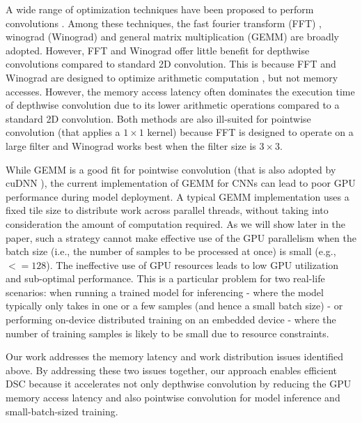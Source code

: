 A wide range of optimization techniques have been proposed to perform convolutions
\cite{Zhen2018Optimizing,liu2019optimizing,winter2019adaptive,li2019autofft,yan2020optimizing,Vasudevan2017Parallel,li2019coordinated,wu2020ugemm}.
Among these techniques, the fast fourier transform (FFT) \cite{li2019autofft}, winograd (Winograd) \cite{yan2020optimizing} and general
matrix multiplication (GEMM) \cite{Vasudevan2017Parallel,li2019coordinated,wu2020ugemm} are broadly adopted. However, FFT and Winograd offer little
benefit for depthwise convolutions compared to standard 2D convolution. This is because FFT and Winograd are designed to optimize
arithmetic computation \cite{zlateski2019anatomy,yan2020optimizing}, but not memory accesses. However, the memory access latency often dominates the execution time of
depthwise convolution \cite{cudaperformance} due to its lower arithmetic operations compared to a standard 2D convolution.  Both methods
are also ill-suited for pointwise convolution (that applies a $1 \times 1$ kernel) because FFT is designed to operate on a large filter and
Winograd works best when the filter size is $3 \times 3$.

While GEMM is a good fit for pointwise convolution (that is also adopted by cuDNN \cite{ChetlurWVCTCS14}), the current implementation of
GEMM for CNNs can lead to poor GPU performance during model deployment. A typical GEMM implementation uses a fixed tile size to distribute
work across parallel threads, without taking into consideration the amount of computation required. As we will show later in the paper,
such a strategy cannot make effective use of the GPU parallelism when the batch size (i.e., the number of samples to be processed at once)
is small (e.g., $<= 128$). The ineffective use of GPU resources leads to low GPU utilization and sub-optimal performance. This is a
particular problem for two real-life scenarios: when running a trained model for inferencing - where the model typically only takes in one
or a few samples (and hence a small batch size) - or performing on-device distributed training on an embedded device - where the number of
training samples is likely to be small due to resource constraints.

Our work addresses the memory latency and work distribution issues identified above. By addressing these two issues together, our approach
enables efficient DSC because it accelerates not only depthwise convolution by reducing the GPU memory access latency and also pointwise
convolution for model inference and small-batch-sized training.


